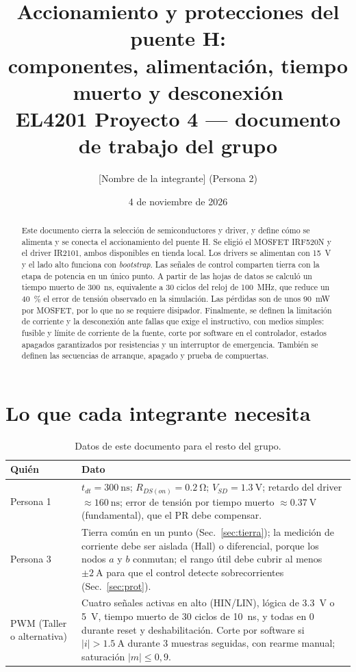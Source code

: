 \documentclass[10pt,twocolumn,letterpaper]{article}
\title{\textbf{Accionamiento y protecciones del puente H:\\ componentes, alimentación, tiempo muerto y desconexión}\\[3pt]
\large EL4201 Proyecto 4 --- documento de trabajo del grupo}
\author{[Nombre de la integrante] (Persona 2)}
\date{4 de noviembre de 2026}
\begin{document}
\maketitle

\begin{abstract}
Este documento cierra la selección de semiconductores y driver, y define cómo se alimenta y se conecta el accionamiento del puente H. Se eligió el MOSFET IRF520N y el driver IR2101, ambos disponibles en tienda local. Los drivers se alimentan con \SI{15}{\volt} y el lado alto funciona con \emph{bootstrap}. Las señales de control comparten tierra con la etapa de potencia en un único punto. A partir de las hojas de datos se calculó un tiempo muerto de \SI{300}{\nano\second}, equivalente a 30 ciclos del reloj de \SI{100}{\mega\hertz}, que reduce un \SI{40}{\percent} el error de tensión observado en la simulación. Las pérdidas son de unos \SI{90}{\milli\watt} por MOSFET, por lo que no se requiere disipador. Finalmente, se definen la limitación de corriente y la desconexión ante fallas que exige el instructivo, con medios simples: fusible y límite de corriente de la fuente, corte por software en el controlador, estados apagados garantizados por resistencias y un interruptor de emergencia. También se definen las secuencias de arranque, apagado y prueba de compuertas.
\end{abstract}

\section{Lo que cada integrante necesita}
\begin{table}[!h]
\centering
\caption{Datos de este documento para el resto del grupo.}
\label{tab:grupo}
\footnotesize
\begin{tabular}{@{}L{1.6cm}L{6.2cm}@{}}
\toprule
Quién & Dato \\
\midrule
Persona 1 & $t_{dt}=\SI{300}{\nano\second}$; $R_{DS(on)}=\SI{0,2}{\ohm}$; $V_{SD}=\SI{1,3}{\volt}$; retardo del driver $\approx\SI{160}{\nano\second}$; error de tensión por tiempo muerto $\approx\SI{0,37}{\volt}$ (fundamental), que el PR debe compensar. \\
Persona 3 & Tierra común en un punto (Sec.~\ref{sec:tierra}); la medición de corriente debe ser aislada (Hall) o diferencial, porque los nodos $a$ y $b$ conmutan; el rango útil debe cubrir al menos $\pm\SI{2}{\ampere}$ para que el control detecte sobrecorrientes (Sec.~\ref{sec:prot}). \\
PWM (Taller o alternativa) & Cuatro señales activas en alto (HIN/LIN), lógica de \SI{3,3}{\volt} o \SI{5}{\volt}, tiempo muerto de 30 ciclos de \SI{10}{\nano\second}, y todas en 0 durante reset y deshabilitación. Corte por software si $|i|>\SI{1,5}{\ampere}$ durante 3 muestras seguidas, con rearme manual; saturación $|m|\le0{,}9$. \\
\bottomrule
\end{tabular}
\end{table}
\end{document}
